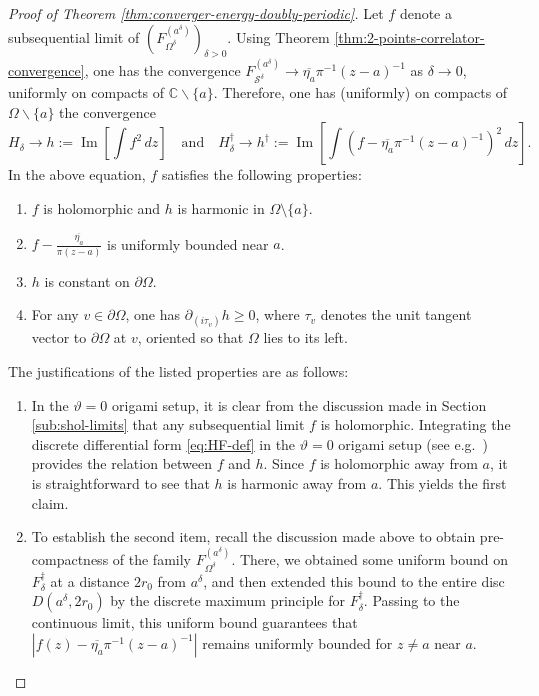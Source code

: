 \documentclass[reqno]{amsart}
\numberwithin{equation}{section}
\theoremstyle{definition}
\theoremstyle{remark}
\renewcommand\Im{\operatorname{Im}}
\newcommand\cS{\mathcal{S}}
\begin{document}
\begin{proof}[Proof of Theorem \ref{thm:converger-energy-doubly-periodic}]
Let $f$ denote a subsequential limit of $(F^{(a^\delta)}_{\Omega^\delta})_{\delta>0}$. Using Theorem \ref{thm:2-points-correlator-convergence}, one has the convergence  $F^{(a^\delta)}_{\cS^\delta} \to \overline{\eta_a}\pi^{-1}(z-a)^{-1}$  as $ \delta \to 0$, uniformly on compacts of $\mathbb{C}\backslash \{a\}$. Therefore, one has (uniformly) on compacts of $ \Omega \backslash \{ a \}$ the convergence
\[
H_\delta \to h := \Im\!\left[\int f^2\,dz\right]
\quad \text{and} \quad
H^\dagger_\delta \to h^\dagger := \Im\!\left[\int (f - \overline{\eta_a}\pi^{-1}(z-a)^{-1})^2\,dz\right].
\]
In the above equation, $f$ satisfies the following properties:
\begin{enumerate}
	\item $f$ is holomorphic and $h$ is harmonic in $\Omega \setminus \{a\}$.
	\item $f - \frac{\overline{\eta_a}}{\pi(z-a)}$ is uniformly bounded near $a$.
	\item $h$ is constant on $\partial \Omega$.
	\item For any $v \in \partial \Omega$, one has $\partial_{(i\tau_v)}h \geq 0$, where $\tau_v$ denotes the unit tangent vector to $\partial \Omega$ at $v$, oriented so that $\Omega$ lies to its left.
\end{enumerate}
The justifications of the listed properties are as follows:
\begin{enumerate}
	\item In the $\vartheta = 0$ origami setup, it is clear from the discussion made in Section \ref{sub:shol-limits} that any subsequential limit $f$ is holomorphic. Integrating the discrete differential form \eqref{eq:HF-def} in the $\vartheta = 0$ origami setup (see e.g.\ \cite[Proposition 2.21]{Che20}) provides the relation between $f$ and $h$. Since $f$ is holomorphic away from $a$, it is straightforward to see that $h$ is harmonic away from $a$. This yields the first claim.
	\item To establish the second item, recall the discussion made above to obtain pre-compactness of the family $ F^{(a^\delta)}_{\Omega^\delta}$. There, we obtained some uniform bound on $F^\dagger_\delta$ at a distance $2r_0$ from $a^\delta$, and then extended this bound to the entire disc $D(a^\delta,2r_0)$ by the discrete maximum principle for $F^\dagger_\delta$. Passing to the continuous limit, this uniform bound guarantees that $|f(z) - \overline{\eta_a}\pi^{-1}(z-a)^{-1}|$ remains uniformly bounded for $z\neq a$ near $a$. 

\end{enumerate}
\end{proof}
\end{document}

